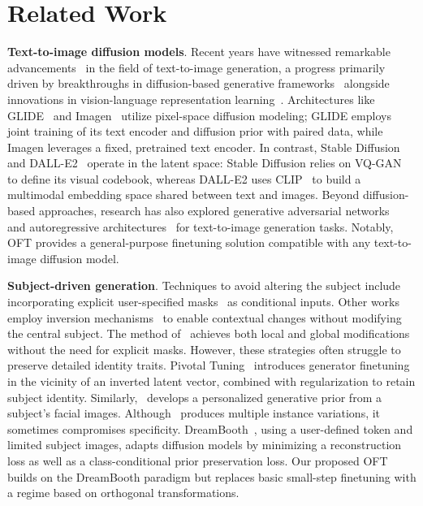 \section{Related Work}

\textbf{Text-to-image diffusion models}. Recent years have witnessed remarkable advancements~\cite{saharia2022photorealistic,ramesh2022hierarchical,rombach2022high,gu2022vector,nichol2022glide} in the field of text-to-image generation, a progress primarily driven by breakthroughs in diffusion-based generative frameworks~\cite{ho2020denoising,song2021score,song2021denoising,dhariwal2021diffusion} alongside innovations in vision-language representation learning~\cite{su2020vlbert,lu2019vilbert,radford2021learning,wang2021simvlm,li2022blip,li2023blip,alayrac2022flamingo,schuhmann2022laion}. Architectures like GLIDE~\cite{nichol2022glide} and Imagen~\cite{saharia2022photorealistic} utilize pixel-space diffusion modeling; GLIDE employs joint training of its text encoder and diffusion prior with paired data, while Imagen leverages a fixed, pretrained text encoder. In contrast, Stable Diffusion~\cite{rombach2022high} and DALL-E2~\cite{ramesh2022hierarchical} operate in the latent space: Stable Diffusion relies on VQ-GAN~\cite{esser2021taming} to define its visual codebook, whereas DALL-E2 uses CLIP~\cite{radford2021learning} to build a multimodal embedding space shared between text and images. Beyond diffusion-based approaches, research has also explored generative adversarial networks~\cite{reed2016generative,zhang2017stackgan,xu2018attngan,li2019controllable} and autoregressive architectures~\cite{ramesh2021zero,ding2021cogview,wu2022nuwa,yuscaling} for text-to-image generation tasks. Notably, OFT provides a general-purpose finetuning solution compatible with any text-to-image diffusion model.

\textbf{Subject-driven generation}. Techniques to avoid altering the subject include incorporating explicit user-specified masks~\cite{avrahami2022blended,nichol2022glide} as conditional inputs. Other works employ inversion mechanisms~\cite{choi2021ilvr,dhariwal2021diffusion,ramesh2022hierarchical,gal2022image} to enable contextual changes without modifying the central subject. The method of~\cite{hertz2022prompt} achieves both local and global modifications without the need for explicit masks. However, these strategies often struggle to preserve detailed identity traits. Pivotal Tuning~\cite{roich2022pivotal} introduces generator finetuning in the vicinity of an inverted latent vector, combined with regularization to retain subject identity. Similarly,~\cite{nitzan2022mystyle} develops a personalized generative prior from a subject’s facial images. Although~\cite{casanova2021instance} produces multiple instance variations, it sometimes compromises specificity. DreamBooth~\cite{ruiz2023dreambooth}, using a user-defined token and limited subject images, adapts diffusion models by minimizing a reconstruction loss as well as a class-conditional prior preservation loss. Our proposed OFT builds on the DreamBooth paradigm but replaces basic small-step finetuning with a regime based on orthogonal transformations.

